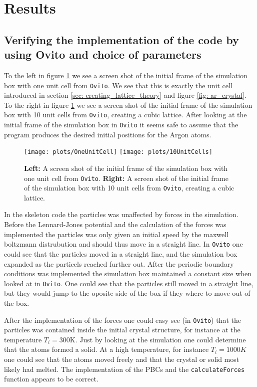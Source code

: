 \documentclass[11pt,a4wide]{article}
\begin{document}
\section{Results} 
\subsection{Verifying the implementation of the code by using Ovito and choice of parameters}

To the left in figure \ref{fig: unitCellsOvito} we see a screen shot of the initial frame of the simulation box with one unit cell from \texttt{Ovito}. We see that this is exactly the unit cell introduced in section \ref{sec: creating_lattice_theory} and figure \ref{fig: ar_crystal}. To the right in figure \ref{fig: unitCellsOvito} we see a screen shot of the initial frame of the simulation box with 10 unit cells from \texttt{Ovito}, creating a cubic lattice. After looking at the initial frame of the simulation box in \texttt{Ovito} it seems safe to assume that the program produces the desired initial positions for the Argon atoms. 

\begin{figure}[htp]
\centering
\texttt{[image: plots/OneUnitCell]}
\texttt{[image: plots/10UnitCells]}
\caption{\textbf{Left:} A screen shot of the initial frame of the simulation box with one unit cell from \texttt{Ovito}. \textbf{Right:} A screen shot of the initial frame of the simulation box with 10 unit cells from \texttt{Ovito}, creating a cubic lattice.}
\label{fig: unitCellsOvito}
\end{figure}

In the skeleton code the particles was unaffected by forces in the simulation. Before the Lennard-Jones potential and the calculation of the forces was implemented the particles was only given an initial speed by the maxwell boltzmann distrubution and should thus move in a straight line. In \texttt{Ovito} one could see that the particles moved in a straight line, and the simulation box expanded as the particels reached further out. After the periodic boundary conditions was implemented the simulation box maintained a constant size when looked at in \texttt{Ovito}. One could see that the particles still moved in a straight line, but they would jump to the oposite side of the box if they where to move out of the box. 

After the implementation of the forces one could easy see (in \texttt{Ovito}) that the particles was contained inside the initial crystal structure, for instance at the temperature $T_i =300$K. Just by looking at the simulation one could determine that the atoms formed a solid. At a high temperature, for instance $T_i = 1000K$ one could see that the atoms moved freely and that the crystal or solid most likely had melted. The implementation of the PBCs and the \texttt{calculateForces} function appears to be correct.
\end{document}
